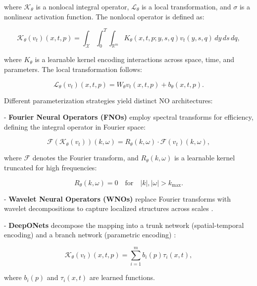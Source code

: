 where \( \mathcal{K}_\theta \) is a nonlocal integral operator, \( \mathcal{L}_\theta \) is a local transformation, and \( \sigma \) is a nonlinear activation function. The nonlocal operator is defined as:

\begin{equation}
\mathcal{K}_\theta(v_t)(x, t, p) = \int_{\mathcal{X}} \int_0^T \int_{\mathbb{R}^m} K_\theta(x, t, p; y, s, q) v_t(y, s, q) \, dy \, ds \, dq,
\end{equation}

where \( K_\theta \) is a learnable kernel encoding interactions across space, time, and parameters. The local transformation follows:

\begin{equation}
\mathcal{L}_\theta(v_t)(x, t, p) = W_\theta v_t(x, t, p) + b_\theta(x, t, p).
\end{equation}

Different parameterization strategies yield distinct NO architectures:

- \textbf{Fourier Neural Operators (FNOs)} employ spectral transforms for efficiency, defining the integral operator in Fourier space:

\begin{equation}
\mathcal{F}(\mathcal{K}_\theta(v_t))(k, \omega) = R_\theta(k, \omega) \cdot \mathcal{F}(v_t)(k, \omega),
\end{equation}

where \( \mathcal{F} \) denotes the Fourier transform, and \( R_\theta(k, \omega) \) is a learnable kernel truncated for high frequencies:

\begin{equation}
R_\theta(k, \omega) = 0 \quad \text{for} \quad |k|, |\omega| > k_{\text{max}}.
\end{equation}

- \textbf{Wavelet Neural Operators (WNOs)} replace Fourier transforms with wavelet decompositions to capture localized structures across scales \citep{tripura2023wavelet}.

- \textbf{DeepONets} decompose the mapping into a trunk network (spatial-temporal encoding) and a branch network (parametric encoding) \citep{lu2021learning}:

\begin{equation}
\mathcal{K}_\theta(v_t)(x, t, p) = \sum_{i=1}^m b_i(p) \tau_i(x, t),
\end{equation}

where \( b_i(p) \) and \( \tau_i(x, t) \) are learned functions.

